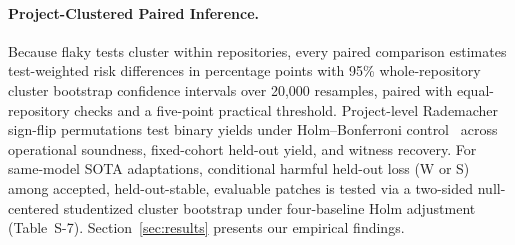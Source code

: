 \paragraph{Project-Clustered Paired Inference.}
Because flaky tests cluster within repositories, every paired comparison estimates test-weighted risk differences in percentage points with 95\% whole-repository cluster bootstrap confidence intervals over 20,000 resamples, paired with equal-repository checks and a five-point practical threshold. Project-level Rademacher sign-flip permutations test binary yields under Holm--Bonferroni control~\cite{holm1979simple} across operational soundness, fixed-cohort held-out yield, and witness recovery. For same-model SOTA adaptations, conditional harmful held-out loss (W or S) among accepted, held-out-stable, evaluable patches is tested via a two-sided null-centered studentized cluster bootstrap under four-baseline Holm adjustment (Table~S-7). Section~\ref{sec:results} presents our empirical findings.
